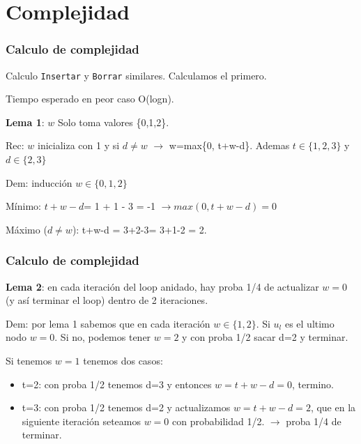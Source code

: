 \documentclass[10pt]{beamer}
\begin{document}
\section{Complejidad}
\begin{frame}
\frametitle{Calculo de complejidad}

Calculo \texttt{Insertar} y \texttt{Borrar} similares.
Calculamos el primero.

Tiempo esperado  en peor caso O(logn).
\vspace{-0.2cm}
\pause


\textbf{Lema 1}: $w$ Solo toma valores \{0,1,2\}.

Rec: $w$ inicializa con 1 y si $d\neq w$ $\to$ w=max\{0, t+w-d\}.
Ademas $t\in\{1,2,3\}$ y $d\in\{2,3\}$

\pause
Dem: inducción $w\in \{0,1,2\}$
\pause

Mínimo: $t+w-d$= 1 + 1 - 3 = -1 $\rightarrow max(0, t+w-d)=0$
\pause

Máximo ($d\neq w$): t+w-d = 3+2-3= 3+1-2 = 2.


\end{frame}
\begin{frame}
\frametitle{Calculo de complejidad}
\textbf{Lema 2}: en cada iteración del loop anidado, hay proba 1/4 de actualizar $w=0$ (y así terminar el loop) dentro de 2 iteraciones.
\vspace{-0.2cm}
\pause

Dem: por lema 1 sabemos que en cada iteración $w\in\{1,2\}$.
Si $u_l$ es el ultimo nodo $w=0$.
Si no, podemos tener $w=2$ y con proba 1/2 sacar d=2 y terminar.

Si tenemos $w=1$ tenemos dos casos:
\vspace{-0.3cm}
\pause
\begin{itemize}\itemsep-1em
  \item t=2: con proba 1/2 tenemos d=3 y entonces $w=t+w-d=0$, termino.
\pause
  \item t=3: con proba 1/2 tenemos d=2 y actualizamos  $w=t+w-d=2$, que en la siguiente
    iteración seteamos $w=0$ con probabilidad 1/2. $\to$ proba 1/4 de terminar.
\end{itemize}


\end{frame}
\end{document}
